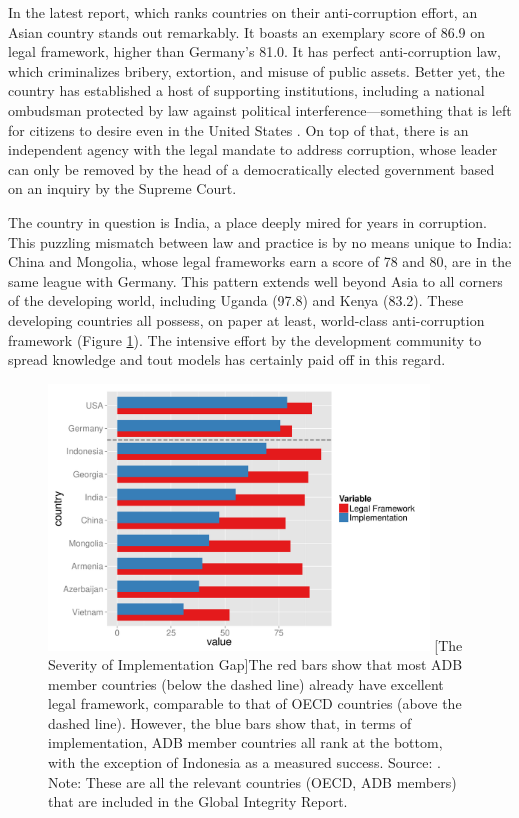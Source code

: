 \documentclass[12pt]{article}
\begin{document}
In the latest \citet{Integrity2012a} report, which ranks countries on their anti-corruption effort, an Asian country stands out remarkably. It boasts an exemplary score of 86.9 on legal framework, higher than Germany's 81.0. It has perfect anti-corruption law, which criminalizes bribery, extortion, and misuse of public assets. Better yet, the country has established a host of supporting institutions, including a national ombudsman protected by law against political interference---something that is left for citizens to desire even in the United States \citep{MinistryofLawandJustice2003}. On top of that, there is an independent agency with the legal mandate to address corruption, whose leader can only be removed by the head of a democratically elected government based on an inquiry by the Supreme Court.

The country in question is India, a place deeply mired for years in corruption. This puzzling mismatch between law and practice is by no means unique to India: China and Mongolia, whose legal frameworks earn a score of 78 and 80, are in the same league with Germany. This pattern extends well beyond Asia to all corners of the developing world, including Uganda (97.8) and Kenya (83.2). These developing countries all possess, on paper at least, world-class anti-corruption framework (Figure \ref{fig:implementation}). The intensive effort by the development community to spread knowledge and tout models has certainly paid off in this regard.

\begin{figure}
\centering
\includegraphics[width=0.9\textwidth]{implementation}
[The Severity of Implementation Gap]{The red bars show that most ADB member countries (below the dashed line) already have excellent legal framework, comparable to that of OECD countries (above the dashed line). However, the blue bars show that, in terms of implementation, ADB member countries all rank at the bottom, with the exception of Indonesia as a measured success. Source: \citet{Integrity2012a}. Note: These are all the relevant countries (OECD, ADB members) that are included in the Global Integrity Report.}
\label{fig:implementation}
\end{figure}
\end{document}
